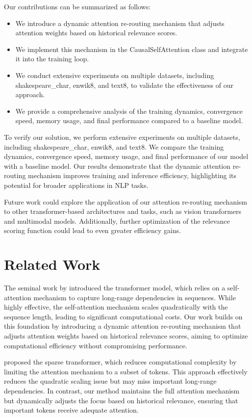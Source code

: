 \documentclass{article} %
\begin{document}
Our contributions can be summarized as follows:
\begin{itemize}
    \item We introduce a dynamic attention re-routing mechanism that adjusts attention weights based on historical relevance scores.
    \item We implement this mechanism in the CausalSelfAttention class and integrate it into the training loop.
    \item We conduct extensive experiments on multiple datasets, including shakespeare\_char, enwik8, and text8, to validate the effectiveness of our approach.
    \item We provide a comprehensive analysis of the training dynamics, convergence speed, memory usage, and final performance compared to a baseline model.
\end{itemize}

To verify our solution, we perform extensive experiments on multiple datasets, including shakespeare\_char, enwik8, and text8. We compare the training dynamics, convergence speed, memory usage, and final performance of our model with a baseline model. Our results demonstrate that the dynamic attention re-routing mechanism improves training and inference efficiency, highlighting its potential for broader applications in NLP tasks.

Future work could explore the application of our attention re-routing mechanism to other transformer-based architectures and tasks, such as vision transformers and multimodal models. Additionally, further optimization of the relevance scoring function could lead to even greater efficiency gains.

\section{Related Work}
\label{sec:related}

The seminal work by \citet{vaswani2017attention} introduced the transformer model, which relies on a self-attention mechanism to capture long-range dependencies in sequences. While highly effective, the self-attention mechanism scales quadratically with the sequence length, leading to significant computational costs. Our work builds on this foundation by introducing a dynamic attention re-routing mechanism that adjusts attention weights based on historical relevance scores, aiming to optimize computational efficiency without compromising performance.

\citet{Child2019GeneratingLS} proposed the sparse transformer, which reduces computational complexity by limiting the attention mechanism to a subset of tokens. This approach effectively reduces the quadratic scaling issue but may miss important long-range dependencies. In contrast, our method maintains the full attention mechanism but dynamically adjusts the focus based on historical relevance, ensuring that important tokens receive adequate attention.
\end{document}
